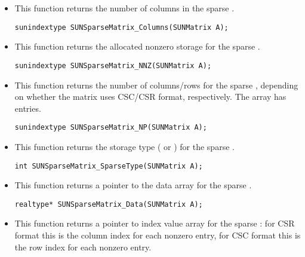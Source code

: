 \begin{itemize}
\item {}

  This function returns the number of columns in the sparse .
 
  \verb|sunindextype SUNSparseMatrix_Columns(SUNMatrix A);|


\item {}

  This function returns the allocated nonzero storage for the sparse .
 
  \verb|sunindextype SUNSparseMatrix_NNZ(SUNMatrix A);|


\item {}

  This function returns the number of columns/rows for the
  sparse , depending on whether the matrix uses CSC/CSR
  format, respectively.  The  array has  entries.
 
  \verb|sunindextype SUNSparseMatrix_NP(SUNMatrix A);|


\item {}

  This function returns the storage type (
  or ) for the sparse .
 
  \verb|int SUNSparseMatrix_SparseType(SUNMatrix A);|


\item {}

  This function returns a pointer to the data array for the
  sparse . 
 
  \verb|realtype* SUNSparseMatrix_Data(SUNMatrix A);|


\item {}

  This function returns a pointer to index value array for the sparse
  : for CSR format this is the column index for each nonzero
  entry, for CSC format this is the row index for each nonzero entry.
 

\end{itemize}
